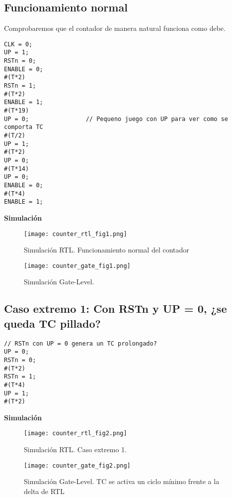 \documentclass{article}
\begin{document}
\subsection{Funcionamiento normal}
Comprobaremos que el contador de manera natural funciona como debe.
\begin{lstlisting}[style=verilog]
CLK = 0;
UP = 1;
RSTn = 0;
ENABLE = 0;
#(T*2)
RSTn = 1;
#(T*2)
ENABLE = 1;
#(T*19)
UP = 0;                // Pequeno juego con UP para ver como se comporta TC
#(T/2)
UP = 1;
#(T*2)
UP = 0;
#(T*14)
UP = 0;
ENABLE = 0;
#(T*4)
ENABLE = 1;
\end{lstlisting}
\textbf{Simulación}
\begin{figure}[h!]
    \centering
    \texttt{[image: counter\_rtl\_fig1.png]} 
    \caption{Simulación RTL. Funcionamiento normal del contador}
\end{figure}
\begin{figure}[h!]
    \centering
    \texttt{[image: counter\_gate\_fig1.png]} 
    \caption{Simulación Gate-Level.}
    \label{fig:ejemplo}
\end{figure}

\newpage

\subsection{Caso extremo 1: Con RSTn y UP = 0, ¿se queda TC pillado?}
\begin{lstlisting}[style=verilog]
// RSTn con UP = 0 genera un TC prolongado?
UP = 0;
RSTn = 0;
#(T*2)
RSTn = 1;
#(T*4)
UP = 1;
#(T*2)
\end{lstlisting}
\textbf{Simulación} 
\begin{figure}[h!]
    \centering
    \texttt{[image: counter\_rtl\_fig2.png]} 
    \caption{Simulación RTL. Caso extremo 1.}
\end{figure}
\begin{figure}[h!]
    \centering
    \texttt{[image: counter\_gate\_fig2.png]} 
    \caption{Simulación Gate-Level. TC se activa un ciclo mínimo frente a la delta de RTL}
\end{figure}
\end{document}
